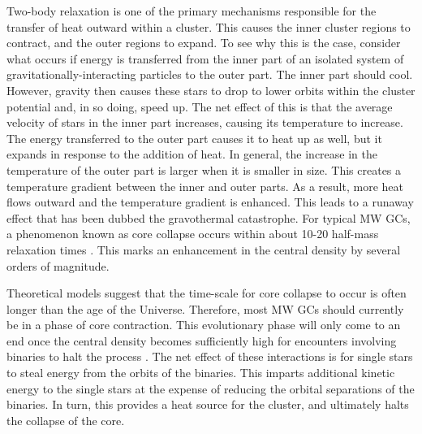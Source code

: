 Two-body relaxation is one of the primary mechanisms responsible for
the transfer of heat outward within a cluster.  This causes the inner
cluster regions to contract, and the outer regions to expand.
To see why this is the case, consider what occurs if energy is
transferred from the inner part of 
an isolated system of gravitationally-interacting particles to the
outer part.  The inner part should cool.  However, gravity then causes
these stars to drop to lower orbits within the cluster potential and,
in so doing, speed up.  
The net effect of this is that the average velocity of stars in the
inner part increases, causing its temperature to increase.  The energy
transferred to the outer part causes it to heat up as well, but it
expands in response to the addition of heat.  In general, the increase
in the temperature of the outer part is larger when it is smaller in
size.  This creates a temperature gradient between the inner and 
outer parts.  As a result, more heat flows outward and the temperature
gradient is enhanced.  This leads to a 
runaway effect that has been dubbed the gravothermal catastrophe.
For typical MW GCs, a phenomenon known as core collapse occurs within
about 10-20 half-mass relaxation times \citep{henon69, spitzer75, hut92}.
This marks an enhancement in the central density by several orders of
magnitude. 

Theoretical models suggest that the time-scale for core collapse to occur is
often longer than the age of the Universe.  Therefore, most MW GCs should 
currently be in a phase of core contraction.  This evolutionary phase
will only come to an end once the central 
density becomes sufficiently high for encounters involving
binaries to halt the process \citep[e.g.][]{hut83c, goodman93, fregeau09}.  
The net effect of these interactions 
is for single stars to steal energy from the orbits of the
binaries.  This imparts additional kinetic energy to the single stars
at the expense of reducing the orbital separations of the binaries.
In turn, this provides a heat source for the cluster, and ultimately
halts the collapse of the core.

%


